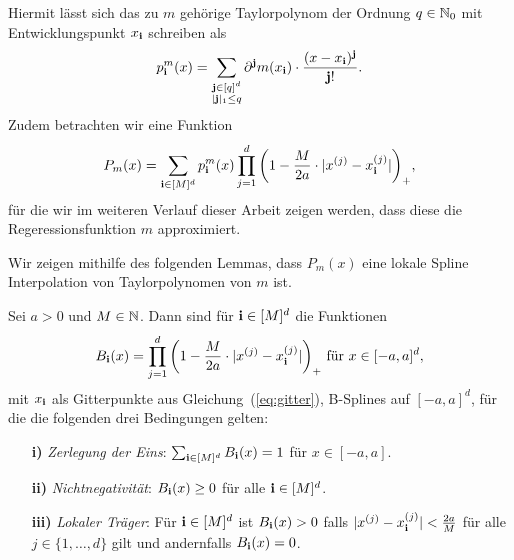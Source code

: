 Hiermit lässt sich das zu $m$ gehörige Taylorpolynom der Ordnung $q \in \mathbb{N}_0$ mit Entwicklungspunkt $x_{\mathbf{i}}$ schreiben als
$$p_{\mathbf{i}}^m(x) = \sum_{\substack{\mathbf{j} \in [q]^d \\|\mathbf{j}|_1 \leq q}} \partial^{\mathbf{j}}m(x_{\mathbf{i}}) \cdot \frac{(x - x_{\mathbf{i}})^{\mathbf{j}}}{\mathbf{j}!}.$$
Zudem betrachten wir eine Funktion
\begin{equation}
\label{konvexkomb}
P_m(x) = \sum_{\mathbf{i} \in [M]^d} p_{\mathbf{i}}^m(x) \prod_{j = 1}^{d} \bigg(1 - \frac{M}{2a} \cdot |x^{(j)} - x_{\mathbf{i}}^{(j)}|\bigg)_+,
\end{equation}
für die wir im weiteren Verlauf dieser Arbeit zeigen werden, dass diese die Regeressionsfunktion $m$ approximiert.

Wir zeigen mithilfe des folgenden Lemmas, dass $P_m(x)$ eine lokale Spline Interpolation von Taylorpolynomen von $m$ ist.
\begin{lem}
\label{lem:loccon}
Sei $a >0$ und $M \in \mathbb{N}$. Dann sind für $\mathbf{i} \in [M]^d$ die Funktionen 
$$B_{\mathbf{i}}(x) = \prod_{j = 1}^{d} \bigg(1 - \frac{M}{2a} \cdot |x^{(j)} - x_{\mathbf{i}}^{(j)}|\bigg)_+ \text{ für } x \in [-a, a]^d,$$
mit $x_{\mathbf{i}}$ als Gitterpunkte aus Gleichung~(\ref{eq:gitter}), B-Splines auf $[-a, a]^d$, für die die folgenden drei Bedingungen gelten:
\begin{itemize}
\item[\textbf{i)}] \emph{Zerlegung der Eins}: $\sum_{\mathbf{i} \in [M]^d} B_{\mathbf{i}}(x) = 1$ für $x \in [-a, a]$.
\item[\textbf{ii)}] \emph{Nichtnegativität}: $B_{\mathbf{i}}(x) \geq 0$ für alle $\mathbf{i} \in [M]^d$.
\item[\textbf{iii)}] \emph{Lokaler Träger}: Für $\mathbf{i} \in [M]^d$ ist $B_{\mathbf{i}}(x) > 0$ falls $|x^{(j)} - x_{\mathbf{i}}^{(j)}| < \frac{2a}{M}$ für alle $j \in \{1,\dots,d\}$ gilt und andernfalls $B_{\mathbf{i}}(x) = 0$.
\end{itemize}
\end{lem}
